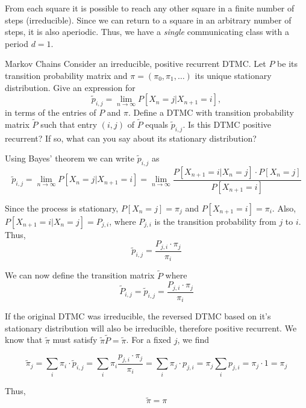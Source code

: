 \begin{solution}
  From each square it is possible to reach any other square in a finite number of steps (irreducible). Since we can return to a square in an arbitrary number of steps, it is also aperiodic. Thus, we have a \textit{single} communicating class with a period $d=1$.
\end{solution}

\begin{problem}{Markov Chains}
Consider an irreducible, positive recurrent DTMC. Let \( P \) be its transition probability matrix and \( \pi = (\pi_0, \pi_1, \ldots) \) its unique stationary distribution. Give an expression for
\[
\tilde{p}_{i,j} = \lim_{n \to \infty} P[X_n = j | X_{n+1} = i],
\]
in terms of the entries of \( P \) and \( \pi \). Define a DTMC with transition probability matrix \( \tilde{P} \) such that entry \( (i, j) \) of \( \tilde{P} \) equals \( \tilde{p}_{i,j} \). Is this DTMC positive recurrent? If so, what can you say about its stationary distribution?
\end{problem}

\begin{solution}
  Using Bayes' theorem we can write $\tilde{p}_{i,j}$ as
  \[
    \tilde{p}_{i,j} = \lim_{n \to \infty} P[X_n = j | X_{n+1} = i] = \lim_{n \to \infty} \frac{P[X_{n+1}=i | X_n = j] \cdot P[X_n=j]}{P[X_{n+1}=i]}
  \]

  Since the process is stationary, $P[X_n=j] = \pi_j$ and $P[X_{n+1}=i] = \pi_i$. Also, $P[X_{n+1}=i | X_n = j] = P_{j,i}$, where $P_{j,i}$ is the transition probability from $j$ to $i$. Thus,
  \[
    \tilde{p}_{i,j} = \frac{P_{j,i}\cdot \pi_j}{\pi_i}
  \]

  We can now define the transition matrix $\tilde{P}$ where
  \[
    \tilde{P}_{i,j}=\tilde{p}_{i,j} = \frac{P_{j,i}\cdot \pi_j}{\pi_i}
  \]

  If the original DTMC was irreducible, the reversed DTMC based on it's stationary distribution will also be irreducible, therefore positive recurrent.
  We know that $\tilde{\pi}$ must satisfy $\tilde{\pi}\tilde{P} = \tilde{\pi}$. For a fixed $j$, we find

  \[
    \tilde{\pi}_j = \sum_i\pi_i\cdot\tilde{p}_{i,j} = \sum_i\pi_i\frac{p_{j,i}\cdot \pi_j}{\pi_i}=\sum_i\pi_j\cdot  p_{j,i}= \pi_j\sum_ip_{j,i} = \pi_j \cdot 1 = \pi_j
  \]

  Thus,
  \[
    \boxed{\tilde{\pi} = \pi}
  \]
\end{solution}

